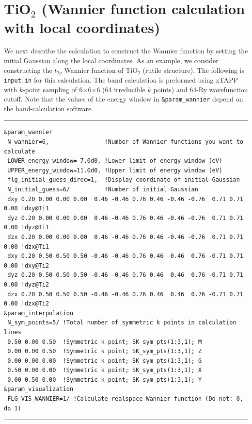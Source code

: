\documentclass{article}
\begin{document}
\section{\label{TiO2}TiO$_2$ (Wannier function calculation with local coordinates)}
We next describe the calculation to construct the Wannier function by setting the initial Gaussian along the local coordinates. As an example, we consider constructing the $t_{2g}$ Wannier function of TiO$_2$ (rutile structure). The following is \verb+input.in+ for this calculation. The band calculation is preformed using {\sc xTAPP} with $k$-point sampling of 6$\times$6$\times$6 (64 irreducible $k$ points) and 64-Ry wavefunction cutoff. Note that the values of the energy window in {\tt \&param\_wannier} depend on the band-calculation software.
\vspace{3mm}\hrule
\begin{verbatim}
&param_wannier 
 N_wannier=6,                !Number of Wannier functions you want to calculate
 LOWER_energy_window= 7.0d0, !Lower limit of energy window (eV)
 UPPER_energy_window=11.0d0, !Upper limit of energy window (eV)
 flg_initial_guess_direc=1,  !Display coordinate of initial Gaussian
 N_initial_guess=6/          !Number of initial Gaussian
 dxy 0.20 0.00 0.00 0.00  0.46 -0.46 0.76 0.46 -0.46 -0.76  0.71 0.71 0.00 !dxy@Ti1
 dyz 0.20 0.00 0.00 0.00  0.46 -0.46 0.76 0.46 -0.46 -0.76  0.71 0.71 0.00 !dyz@Ti1
 dzx 0.20 0.00 0.00 0.00  0.46 -0.46 0.76 0.46 -0.46 -0.76  0.71 0.71 0.00 !dzx@Ti1
 dxy 0.20 0.50 0.50 0.50 -0.46 -0.46 0.76 0.46  0.46  0.76 -0.71 0.71 0.00 !dxy@Ti2
 dyz 0.20 0.50 0.50 0.50 -0.46 -0.46 0.76 0.46  0.46  0.76 -0.71 0.71 0.00 !dyz@Ti2
 dzx 0.20 0.50 0.50 0.50 -0.46 -0.46 0.76 0.46  0.46  0.76 -0.71 0.71 0.00 !dzx@Ti2
&param_interpolation   
 N_sym_points=5/ !Total number of symmetric k points in calculation lines
 0.50 0.00 0.50  !Symmetric k point; SK_sym_pts(1:3,1); M
 0.00 0.00 0.50  !Symmetric k point; SK_sym_pts(1:3,1); Z
 0.00 0.00 0.00  !Symmetric k point; SK_sym_pts(1:3,1); G
 0.50 0.00 0.00  !Symmetric k point; SK_sym_pts(1:3,1); X
 0.00 0.50 0.00  !Symmetric k point; SK_sym_pts(1:3,1); Y
&param_visualization   
 FLG_VIS_WANNIER=1/ !Calculate realspace Wannier function (Do not: 0, do 1)     
\end{verbatim}
\hrule\vspace{3mm}
\end{document}

